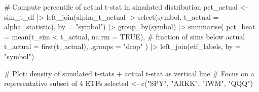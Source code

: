 \documentclass[
  letterpaper,
  DIV=11,
  numbers=noendperiod]{scrartcl}
\newenvironment{Shaded}{\begin{snugshade}}{\end{snugshade}}
\newcommand{\AttributeTok}[1]{\textcolor[rgb]{0.40,0.45,0.13}{#1}}
\newcommand{\CommentTok}[1]{\textcolor[rgb]{0.37,0.37,0.37}{#1}}
\newcommand{\ConstantTok}[1]{\textcolor[rgb]{0.56,0.35,0.01}{#1}}
\newcommand{\FunctionTok}[1]{\textcolor[rgb]{0.28,0.35,0.67}{#1}}
\newcommand{\NormalTok}[1]{\textcolor[rgb]{0.00,0.23,0.31}{#1}}
\newcommand{\OtherTok}[1]{\textcolor[rgb]{0.00,0.23,0.31}{#1}}
\newcommand{\SpecialCharTok}[1]{\textcolor[rgb]{0.37,0.37,0.37}{#1}}
\newcommand{\StringTok}[1]{\textcolor[rgb]{0.13,0.47,0.30}{#1}}
\begin{document}
\begin{Shaded}
\begin{Highlighting}[]
\CommentTok{\# Compute percentile of actual t{-}stat in simulated distribution}
\NormalTok{pct\_actual }\OtherTok{\textless{}{-}}\NormalTok{ sim\_t\_df }\SpecialCharTok{|\textgreater{}}
  \FunctionTok{left\_join}\NormalTok{(alpha\_t\_actual }\SpecialCharTok{|\textgreater{}} \FunctionTok{select}\NormalTok{(symbol, }\AttributeTok{t\_actual =}\NormalTok{ alpha\_statistic),}
            \AttributeTok{by =} \StringTok{"symbol"}\NormalTok{) }\SpecialCharTok{|\textgreater{}}
  \FunctionTok{group\_by}\NormalTok{(symbol) }\SpecialCharTok{|\textgreater{}}
  \FunctionTok{summarise}\NormalTok{(}
    \AttributeTok{pct\_beat =} \FunctionTok{mean}\NormalTok{(t\_sim }\SpecialCharTok{\textless{}}\NormalTok{ t\_actual, }\AttributeTok{na.rm =} \ConstantTok{TRUE}\NormalTok{),  }\CommentTok{\# fraction of sims below actual}
    \AttributeTok{t\_actual =} \FunctionTok{first}\NormalTok{(t\_actual),}
    \AttributeTok{.groups =} \StringTok{"drop"}
\NormalTok{  ) }\SpecialCharTok{|\textgreater{}}
  \FunctionTok{left\_join}\NormalTok{(etf\_labels, }\AttributeTok{by =} \StringTok{"symbol"}\NormalTok{)}

\CommentTok{\# Plot: density of simulated t{-}stats + actual t{-}stat as vertical line}
\CommentTok{\# Focus on a representative subset of 4 ETFs}
\NormalTok{selected }\OtherTok{\textless{}{-}} \FunctionTok{c}\NormalTok{(}\StringTok{"SPY"}\NormalTok{, }\StringTok{"ARKK"}\NormalTok{, }\StringTok{"IWM"}\NormalTok{, }\StringTok{"QQQ"}\NormalTok{)}


\end{Highlighting}
\end{Shaded}
\end{document}
